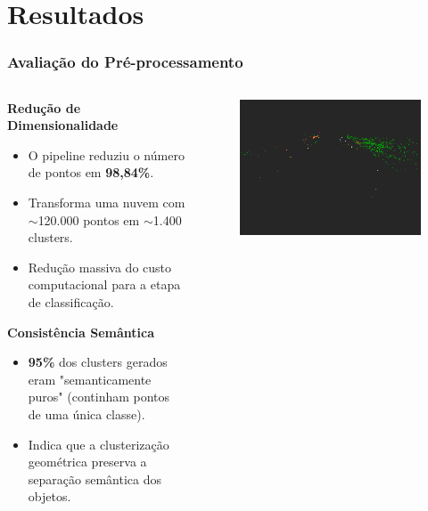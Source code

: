 \documentclass[aspectratio=169,t,xcolor=table]{beamer}
\begin{document}
\section{Resultados}

\begin{frame}
    \frametitle{Avaliação do Pré-processamento}
    \begin{columns}[T]
        \begin{column}{.5\textwidth}
            \textbf{Redução de Dimensionalidade}
            \begin{itemize}
                \item O pipeline reduziu o número de pontos em \textbf{98,84\%}.
                \item Transforma uma nuvem com $\sim$120.000 pontos em $\sim$1.400 clusters.
                \item Redução massiva do custo computacional para a etapa de classificação.
            \end{itemize}
            \vspace{1cm}
            \textbf{Consistência Semântica}
            \begin{itemize}
                \item \textbf{95\%} dos clusters gerados eram "semanticamente puros" (continham pontos de uma única classe).
                \item Indica que a clusterização geométrica preserva a separação semântica dos objetos.
            \end{itemize}
        \end{column}
        \begin{column}{.5\textwidth}
            \begin{figure}
                \includegraphics[width=\textwidth]{figs/cluster_1_s4f75.png}

\end{figure}
\end{column}
\end{columns}
\end{frame}
\end{document}
